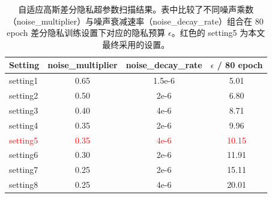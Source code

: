 \begin{table}[!htb]
\centering
\caption{自适应高斯差分隐私超参数扫描结果。表中比较了不同噪声乘数（noise\_multiplier）与噪声衰减速率（noise\_decay\_rate）组合在 80 epoch 差分隐私训练设置下对应的隐私预算 $\epsilon$。红色的 setting5 为本文最终采用的设置。}
\label{tab:privacy-scan}
\begin{tabular}{lccc}
\toprule
Setting & noise\_multiplier & noise\_decay\_rate & $\epsilon$ / 80 epoch \\
\midrule
setting1 & 0.65 & 1.5e-6 & 5.01 \\
setting2 & 0.50 & 2e-6 & 6.80 \\
setting3 & 0.40 & 4e-6 & 8.71 \\
setting4 & 0.35 & 2e-6 & 9.96 \\
\textcolor{red}{setting5} & \textcolor{red}{0.35} & \textcolor{red}{4e-6} & \textcolor{red}{10.15} \\
setting6 & 0.30 & 2e-6 & 11.91 \\
setting7 & 0.25 & 2e-6 & 15.11 \\
setting8 & 0.25 & 4e-6 & 20.01 \\
\bottomrule
\end{tabular}
\end{table}
